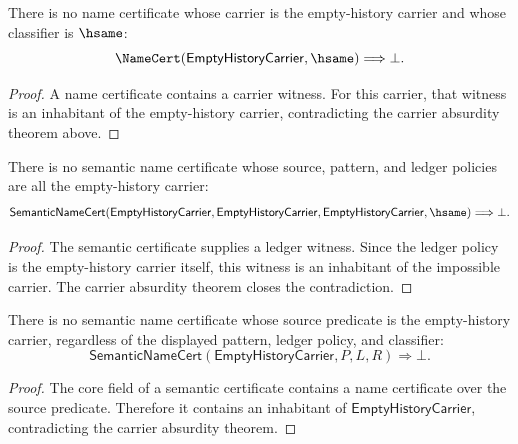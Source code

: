 \begin{theorem}
\label{thm:empty-history-carrier-namecert-absurd}
There is no name certificate whose carrier is the empty-history carrier and
whose classifier is $\hsame$:
$$
\NameCert(\mathsf{EmptyHistoryCarrier},\hsame)\Longrightarrow \bot.
$$
\end{theorem}
\begin{proof}
A name certificate contains a carrier witness. For this carrier, that witness
is an inhabitant of the empty-history carrier, contradicting the carrier
absurdity theorem above.
\end{proof}

\begin{theorem}
\label{thm:empty-history-carrier-semantic-namecert-absurd}
There is no semantic name certificate whose source, pattern, and ledger policies
are all the empty-history carrier:
$$
\mathsf{SemanticNameCert}
(\mathsf{EmptyHistoryCarrier},\mathsf{EmptyHistoryCarrier},
\mathsf{EmptyHistoryCarrier},\hsame)
\Longrightarrow \bot .
$$
\end{theorem}
\begin{proof}
The semantic certificate supplies a ledger witness. Since the ledger policy is
the empty-history carrier itself, this witness is an inhabitant of the
impossible carrier. The carrier absurdity theorem closes the contradiction.
\end{proof}

\begin{theorem}
\label{thm:empty-history-carrier-source-semantic-namecert-absurd}
There is no semantic name certificate whose source predicate is the
empty-history carrier, regardless of the displayed pattern, ledger policy, and
classifier:
$$
\mathsf{SemanticNameCert}
(\mathsf{EmptyHistoryCarrier},P,L,R)
\Longrightarrow \bot .
$$
\end{theorem}
\begin{proof}
The core field of a semantic certificate contains a name certificate over the
source predicate. Therefore it contains an inhabitant of
$\mathsf{EmptyHistoryCarrier}$, contradicting the carrier absurdity theorem.
\end{proof}

